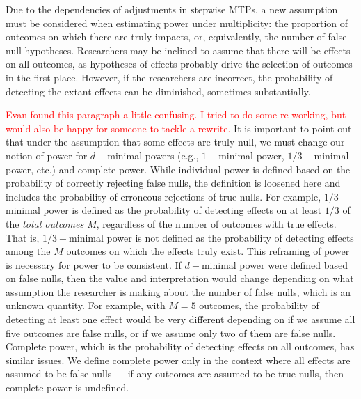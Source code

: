 \documentclass[
]{article}
\begin{document}
Due to the dependencies of adjustments in stepwise MTPs, a new
assumption must be considered when estimating power under multiplicity:
the proportion of outcomes on which there are truly impacts, or,
equivalently, the number of false null hypotheses. Researchers may be
inclined to assume that there will be effects on all outcomes, as
hypotheses of effects probably drive the selection of outcomes in the
first place. However, if the researchers are incorrect, the probability
of detecting the extant effects can be diminished, sometimes
substantially.

\textcolor{red}{Evan found this paragraph a little confusing.  I tried to do some re-working, but would also be happy for someone to tackle a rewrite.}
It is important to point out that under the assumption that some effects
are truly null, we must change our notion of power for \(d-\)minimal
powers (e.g., \(1-\)minimal power, \(1/3-\)minimal power, etc.) and
complete power. While individual power is defined based on the
probability of correctly rejecting false nulls, the definition is
loosened here and includes the probability of erroneous rejections of
true nulls. For example, \(1/3-\)minimal power is defined as the
probability of detecting effects on at least \(1/3\) of the \emph{total
outcomes \(M\)}, regardless of the number of outcomes with true effects.
That is, \(1/3-\)minimal power is not defined as the probability of
detecting effects among the \(M\) outcomes on which the effects truly
exist. This reframing of power is necessary for power to be consistent.
If \(d-\)minimal power were defined based on false nulls, then the value
and interpretation would change depending on what assumption the
researcher is making about the number of false nulls, which is an
unknown quantity. For example, with \(M = 5\) outcomes, the probability
of detecting at least one effect would be very different depending on if
we assume all five outcomes are false nulls, or if we assume only two of
them are false nulls. Complete power, which is the probability of
detecting effects on all outcomes, has similar issues. We define
complete power only in the context where all effects are assumed to be
false nulls --- if any outcomes are assumed to be true nulls, then
complete power is undefined.
\end{document}
